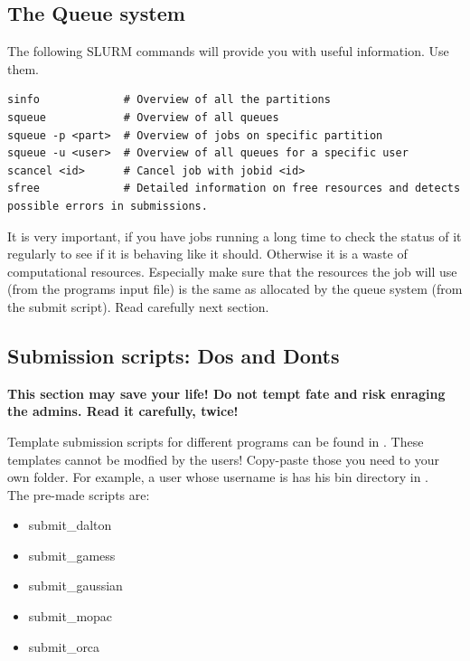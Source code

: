 \documentclass{article}
\begin{document}
\subsection*{The Queue system}

The following SLURM commands will provide you with useful information. Use them.

\begin{lstlisting}
sinfo             # Overview of all the partitions
squeue            # Overview of all queues
squeue -p <part>  # Overview of jobs on specific partition
squeue -u <user>  # Overview of all queues for a specific user
scancel <id>      # Cancel job with jobid <id>
sfree             # Detailed information on free resources and detects possible errors in submissions.
\end{lstlisting}


It is very important, if you have jobs running a long time to check the status of it regularly to see if it is behaving like it should.
Otherwise it is a waste of computational resources.
Especially make sure that the resources the job will use (from the programs input file) is the same as allocated by the queue system (from the submit script). Read carefully next section.\\

\subsection*{Submission scripts: Dos and Donts}

{\bf This section may save your life! Do not tempt fate and risk enraging the admins. Read it carefully, twice!}

Template submission scripts for different programs can be found in . These templates cannot be modfied by the users!
Copy-paste those you need to your own  folder. For example, a user whose username is  has his bin directory in .\\

The pre-made scripts are:

\begin{itemize}
\item{submit\_dalton}
\item{submit\_gamess}
\item{submit\_gaussian}
\item{submit\_mopac}
\item{submit\_orca}
\end{itemize}
\end{document}
